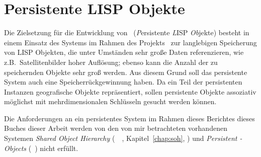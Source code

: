 %
\chapter{Persistente LISP Objekte}%
\label{chap:plob}%
%
Die Zielsetzung f\"{u}r die Entwicklung von \plob\ ({\em P\/}ersistente
{\em L\/}ISP {\em Ob\/}jekte) besteht in einem Einsatz des Systems im
Rahmen des Projekts \oscar\ zur langlebigen Speicherung von LISP
Objekten, die unter Umst\"{a}nden sehr gro\ss{}e Daten referenzieren, wie
z.B.\ Satellitenbilder hoher Aufl\"{o}sung; ebenso kann die Anzahl der zu
speichernden Objekte sehr gro\ss{} werden. Aus diesem Grund soll das
persistente System auch eine Speicherr\"{u}ckgewinnung haben. Da ein Teil
der persistenten Instanzen geografische Objekte repr\"{a}sentiert, sollen
persistente Objekte assoziativ m\"{o}glichst mit mehrdimensionalen
Schl\"{u}sseln gesucht werden k\"{o}n\-nen.
%
\par{}Die Anforderungen an ein persistentes System im Rahmen
\ifbericht dieses Berichtes \else\ifbuch dieses Buches \else dieser
Arbeit \fi\fi werden von den von mir betrachteten vorhandenen Systemen
{\em Shared Object Hierarchy\/} (\soh\ifbericht\ 
\cite[]{bib:ki94a}\ \else, Kapitel~\ref{chap:soh},
\citepage{\pageref{chap:soh}}\fi) und {\em Persistent \clos-Objects\/}
(\pclos\ \cite{bib:pa91a}) nicht erf\"{u}llt.
%
